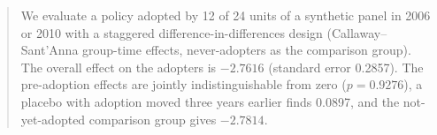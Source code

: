 \begin{abstract}
We evaluate a policy adopted by 12 of 24 units of a synthetic panel in 2006 or 2010 with a staggered difference-in-differences design (Callaway--Sant'Anna group-time effects, never-adopters as the comparison group). The overall effect on the adopters is $-2.7616$ (standard error 0.2857). The pre-adoption effects are jointly indistinguishable from zero ($p = 0.9276$), a placebo with adoption moved three years earlier finds 0.0897, and the not-yet-adopted comparison group gives $-2.7814$.
\end{abstract}
